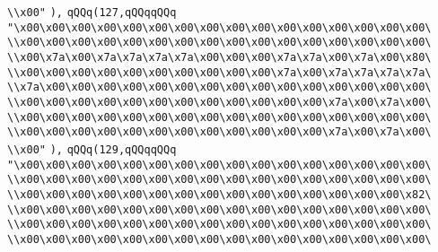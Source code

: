\verb|\\x00"|\newline
\verb|),|\newline
\verb|qQQq(127,qQQqqQQq|\newline
\verb|"\x00\x00\x00\x00\x00\x00\x00\x00\x00\x00\x00\x00\x00\x00\x00\x00\|\newline
\verb|\\x00\x00\x00\x00\x00\x00\x00\x00\x00\x00\x00\x00\x00\x00\x00\x00\|\newline
\verb|\\x00\x7a\x00\x7a\x7a\x7a\x7a\x00\x00\x00\x7a\x7a\x00\x7a\x00\x80\|\newline
\verb|\\x00\x00\x00\x00\x00\x00\x00\x00\x00\x00\x7a\x00\x7a\x7a\x7a\x7a\|\newline
\verb|\\x7a\x00\x00\x00\x00\x00\x00\x00\x00\x00\x00\x00\x00\x00\x00\x00\|\newline
\verb|\\x00\x00\x00\x00\x00\x00\x00\x00\x00\x00\x00\x00\x7a\x00\x7a\x00\|\newline
\verb|\\x00\x00\x00\x00\x00\x00\x00\x00\x00\x00\x00\x00\x00\x00\x00\x00\|\newline
\verb|\\x00\x00\x00\x00\x00\x00\x00\x00\x00\x00\x00\x00\x7a\x00\x7a\x00\|\newline
\verb|\\x00"|\newline
\verb|),|\newline
\verb|qQQq(129,qQQqqQQq|\newline
\verb|"\x00\x00\x00\x00\x00\x00\x00\x00\x00\x00\x00\x00\x00\x00\x00\x00\|\newline
\verb|\\x00\x00\x00\x00\x00\x00\x00\x00\x00\x00\x00\x00\x00\x00\x00\x00\|\newline
\verb|\\x00\x00\x00\x00\x00\x00\x00\x00\x00\x00\x00\x00\x00\x00\x00\x82\|\newline
\verb|\\x00\x00\x00\x00\x00\x00\x00\x00\x00\x00\x00\x00\x00\x00\x00\x00\|\newline
\verb|\\x00\x00\x00\x00\x00\x00\x00\x00\x00\x00\x00\x00\x00\x00\x00\x00\|\newline
\verb|\\x00\x00\x00\x00\x00\x00\x00\x00\x00\x00\x00\x00\x00\x00\x00\x00\|\newline

